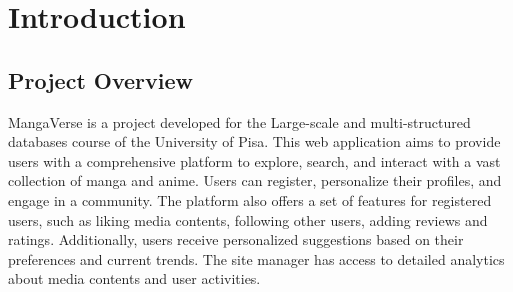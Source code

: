\chapter{Introduction}


\section{Project Overview}
MangaVerse is a project developed for the Large-scale and multi-structured databases course of the University of Pisa.
This web application aims to provide users with a comprehensive platform to explore, search, and interact with a vast collection of manga and anime. Users can register, personalize their profiles, and engage in a community. The platform also offers a set of features for registered users, such as liking media contents, following other users, adding reviews and ratings. 
Additionally, users receive personalized suggestions based on their preferences and current trends. The site manager has access to detailed analytics about media contents and user activities.
